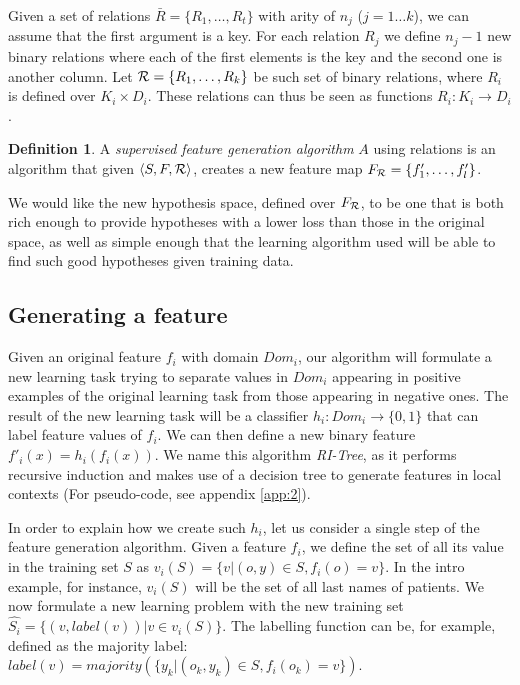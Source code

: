 \documentclass{article}
\theoremstyle{definition}
\newtheorem{defn}{Definition}[section]
\begin{document}
Given a set of relations $\bar{R}=\{R_{1},\ldots,R_{t}\}$ with arity of $n_{j}$ ($j=1\ldots k$), we can assume  that the first argument is a key. For each relation $R_{j}$ we define $n_{j}-1$ new binary relations where each of the first elements is the key and the second one is another column.
Let ${\cal R}=\{R_{1},\ldots,R_{k}\}$ be such set of binary relations, where $R_{i}$ is defined over $K_{i}\times D_{i}$. These relations can thus be seen as functions $R_{i}: K_{i}\rightarrow D_{i}$.

\begin{defn}
	A \emph{supervised feature generation algorithm} $A$ using relations is an algorithm that given $\langle S,F,{\cal R} \rangle$, creates a new feature map $F_{\cal R}=\{f'_{1},\ldots,f'_{l}\}$.
\end{defn}

We would like the new hypothesis space, defined over $F_{\cal R}$, to be one that is both rich enough to provide hypotheses with a lower loss than those in the original space, as well as simple enough that the learning algorithm used will be able to find such good hypotheses given training data.

\subsection{Generating a feature} \label{algorithm_section}

Given an original feature $f_{i}$ with domain $Dom_i$, our algorithm will formulate a new learning task trying to separate values in $Dom_i$ appearing in positive examples of the original learning task from those appearing in negative ones.  The result of the new learning task will be a classifier
$h_{i}:Dom_{i}\rightarrow \{0,1\}$ that can label feature values of $f_{i}$. We can then define a new binary feature $f'_{i}(x)=h_{i}(f_{i}(x))$.
We name this algorithm \emph{RI-Tree}, as it performs recursive induction and makes use of a decision tree to generate features in local contexts (For pseudo-code, see appendix \ref{app:2}).

In order to explain how we create such $h_{i}$, let us consider a single step of the feature generation algorithm.
Given a feature $f_{i}$, we define the set of all its value in the training set $S$ as $v_i(S) = \{v | (o,y) \in S, f_{i}(o)=v\}$. In the intro example, for instance, $v_i(S)$ will be the set of all last names of patients.
We now formulate a new learning problem with the new training set
$\hat{S_i} = \{ (v, label(v)) | v \in v_i(S) \}$.
The labelling function can be, for example, defined as
the majority label: $label(v)=majority(\{y_k| \left(o_k,y_k \right) \in S, f_{i}(o_k)=v\})$.
\end{document}

